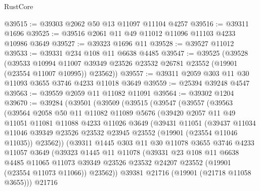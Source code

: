 \begin{lexlean}{RustCore}
\begin{coremodule}
@39515 := @39303 @2062 @50 @13 @11097 @11104 @4257
@39516 := @39311 @1696
@39525 := @39516 @2061 @11 @49 @11012 @11096 @11103 @4233 @10986 @3649
@39527 := @39323 @1696 @11
@39528 := @39527 @11012
@39533 := @39331 @234 @108 @11 @6638 @4485
@39547 := @39525
    (@39528
      (@39533
        @10994
        @11007
        @39349
        @23526
        @23532
        @26781
        @23552
        (@19901 (@23554 @11007 @10995))
        @23562))
@39557 := @39311 @2059 @303 @11 @30 @11093 @3655 @3746 @4233 @11018 @3649
@39559 := @25394 @39248 @4547
@39563 := @39559 @2059 @11 @11082 @11091
@39564 := @39302 @1204
@39670 := @39284
    (@39501
      (@39509
        (@39515
          (@39547
            (@39557
              (@39563
                (@39564
                  @2058
                  @50
                  @11
                  @11082
                  @11089
                  @5676
                  (@39420
                    @2057
                    @11
                    @49
                    @11051
                    @11081
                    @11088
                    @4233
                    @11026
                    @3649
                    (@39431
                      @11051
                      (@39437
                        @11034
                        @11046
                        @39349
                        @23526
                        @23532
                        @23945
                        @23552
                        (@19901 (@23554 @11046 @11035))
                        @23562))
                    (@39311
                      @1445
                      @303
                      @11
                      @30
                      @11078
                      @3655
                      @3746
                      @4233
                      @11057
                      @3649
                      (@39323
                        @1445
                        @11
                        @11078
                        (@39331
                          @23
                          @108
                          @11
                          @6638
                          @4485
                          @11065
                          @11073
                          @39349
                          @23526
                          @23532
                          @24207
                          @23552
                          (@19901 (@23554 @11073 @11066))
                          @23562))
                      @39381
                      @21716
                      (@19901 (@21718 @11058 @3655)))
                    @21716

\end{coremodule}
\end{lexlean}
